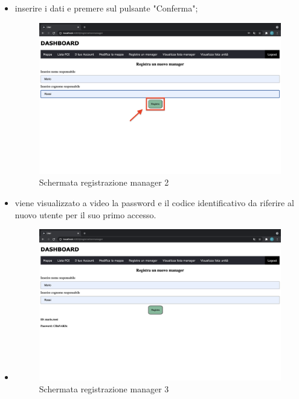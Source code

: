 \begin{itemize}
    \item inserire i dati e premere sul pulsante "Conferma";
    \begin{figure}[H]
        \centering
        \includegraphics[scale=0.12]{res/images/newmanager_2.png}
        \caption{Schermata registrazione manager 2}
    \end{figure}
    \item viene visualizzato a video la password e il codice identificativo da riferire al nuovo utente per il suo primo accesso.
    \item \begin{figure}[H]
        \centering
        \includegraphics[scale=0.12]{res/images/newmanager3.png}
        \caption{Schermata registrazione manager 3}
    \end{figure}
\end{itemize}




